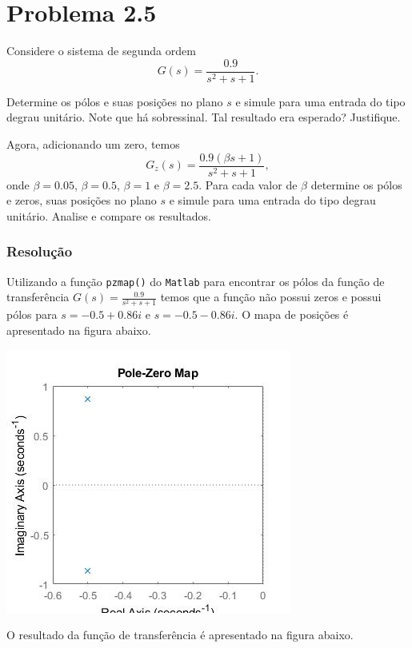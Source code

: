 \documentclass[
]{book}
\theoremstyle{definition}
\theoremstyle{definition}
\theoremstyle{definition}
\theoremstyle{remark}
\begin{document}
\hypertarget{problema-2.5}{%
\section*{Problema 2.5}\label{problema-2.5}}

Considere o sistema de segunda ordem
\[
G(s) = \frac {0.9}{s^2+s+1}.
\]

Determine os pólos e suas posições no plano \(s\) e simule para uma entrada do tipo degrau unitário. Note que há sobressinal. Tal resultado era esperado? Justifique.

Agora, adicionando um zero, temos
\[
G_z(s) = \frac {0.9(\beta s+1)}{s^2+s+1},
\]
onde \(\beta = 0.05\), \(\beta = 0.5\), \(\beta = 1\) e \(\beta = 2.5\). Para cada valor de \(\beta\) determine os pólos e zeros, suas posições no plano \(s\) e simule para uma entrada do tipo degrau unitário. Analise e compare os resultados.

\hypertarget{resoluuxe7uxe3o-4}{%
\subsubsection*{Resolução}\label{resoluuxe7uxe3o-4}}

Utilizando a função \texttt{pzmap()} do \texttt{Matlab} para encontrar os pólos da função de transferência \(G(s) = \frac {0.9}{s^2+s+1}\) temos que a função não possui zeros e possui pólos para \(s = -0.5 + 0.86i\) e \(s = -0.5 -0.86i\). O mapa de posições é apresentado na figura abaixo.

\includegraphics{Imagens/Lab2/prob5.jpg}

O resultado da função de transferência é apresentado na figura abaixo.
\end{document}
